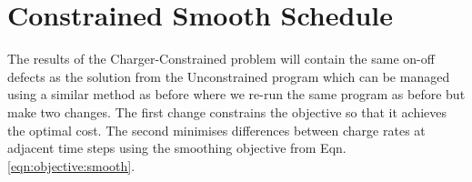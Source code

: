 \section{Constrained Smooth Schedule\label{sec:constrainedSmoothSchedule}}
 \par The results of the Charger-Constrained problem will contain the same on-off defects as the solution from the Unconstrained program which can be managed using a similar method as before where we re-run the same program as before but make two changes. The first change constrains the objective so that it achieves the optimal cost. The second minimises differences between charge rates at adjacent time steps using the smoothing objective from Eqn. \ref{eqn:objective:smooth}.
\\[0.1in] 

